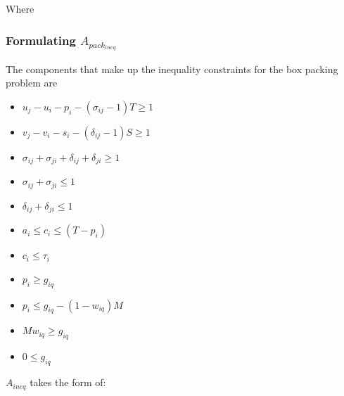\documentclass[letterpaper, 10pt, conference]{IEEEtran}
\begin{document}
Where

\subsubsection{Formulating $A_{pack_{ineq}}$}
The components that make up the inequality constraints for the box
packing problem are

\begin{itemize}
\item
  \(u_j - u_i - p_i - (\sigma_{ij} - 1)T \geq 1\)
\item
  \(v_j - v_i - s_i - (\delta_{ij} - 1)S \geq 1\)
\item
  \(\sigma_{ij} + \sigma_{ji} + \delta_{ij} + \delta_{ji} \geq 1\)
\item
  \(\sigma_{ij} + \sigma_{ji} \leq 1\)
\item
  \(\delta_{ij} + \delta_{ji} \leq 1\)
\item
  \(a_i \leq c_i \leq (T - p_i)\)
\item
  \(c_i \leq \tau_i\)
\item
  \(p_i \geq g_{iq}\)
\item
  \(p_i \leq g_{iq} - (1 - w_{iq})M\)
\item
  \(Mw_{iq} \geq g_{iq}\)
\item
  \(0 \leq g_{iq}\)
\end{itemize}

\(A_{ineq}\) takes the form of:
\end{document}
